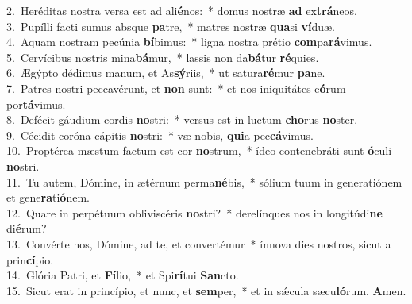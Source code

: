 {2.~}Heréditas nostra versa est ad ali\textbf{é}nos:~* domus nostræ \textbf{ad} ex\textbf{trá}neos.\\
{3.~}Pupílli facti sumus absque \textbf{pa}tre,~* matres nostræ \textbf{qua}si \textbf{ví}duæ.\\
{4.~}Aquam nostram pecúnia \textbf{bí}bimus:~* ligna nostra prétio \textbf{com}pa\textbf{rá}vimus.\\
{5.~}Cervícibus nostris mina\textbf{bá}mur,~* lassis non da\textbf{bá}tur \textbf{ré}quies.\\
{6.~}Ægýpto dédimus manum, et As\textbf{sý}riis,~* ut satura\textbf{ré}mur \textbf{pa}ne.\\
{7.~}Patres nostri peccavérunt, et \textbf{non} sunt:~* et nos iniquitátes e\textbf{ó}rum por\textbf{tá}vimus.\\
{8.~}Defécit gáudium cordis \textbf{no}stri:~* versus est in luctum \textbf{cho}rus \textbf{no}ster.\\
{9.~}Cécidit coróna cápitis \textbf{no}stri:~* væ nobis, \textbf{qui}a pec\textbf{cá}vimus.\\
{10.~}Proptérea mæstum factum est cor \textbf{no}strum,~* ídeo contenebráti sunt \textbf{ó}culi \textbf{no}stri.\\
{11.~}Tu autem, Dómine, in ætérnum perma\textbf{né}bis,~* sólium tuum in generatiónem et gene\textbf{ra}ti\textbf{ó}nem.\\
{12.~}Quare in perpétuum obliviscéris \textbf{no}stri?~* derelínques nos in longitúdi\textbf{ne} di\textbf{é}rum?\\
{13.~}Convérte nos, Dómine, ad te, et convertémur~* ínnova dies nostros, sicut a prin\textbf{cí}pio.\\
{14.~}Glória Patri, et \textbf{Fí}lio,~* et Spi\textbf{rí}tui \textbf{San}cto.\\
{15.~}Sicut erat in princípio, et nunc, et \textbf{sem}per,~* et in sǽcula sæcu\textbf{ló}rum. \textbf{A}men.\\
